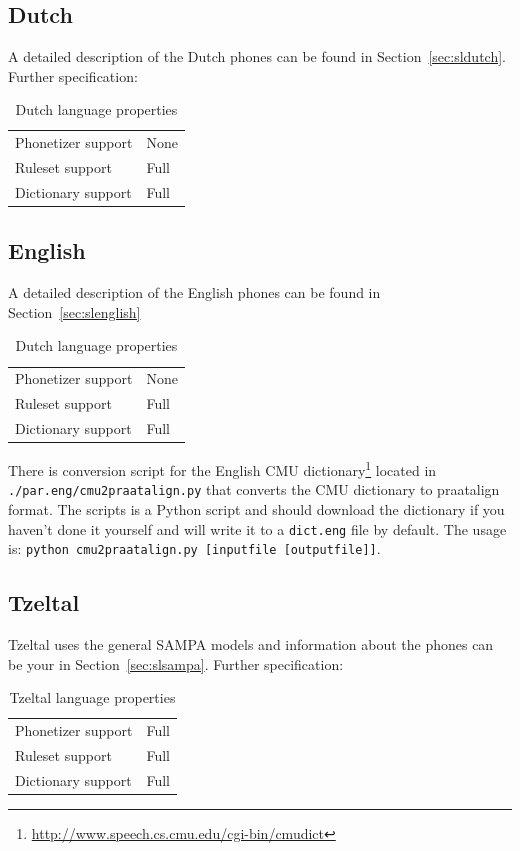 \documentclass[twoside,a4paper]{book}
\begin{document}
\subsection{Dutch}
A detailed description of the Dutch phones can be found in
Section~\ref{sec:sldutch}. Further specification:
\begin{table}[H]
	\caption{Dutch language properties}
	\begin{tabular}{ll}
		Phonetizer support & None\\
		Ruleset support & Full\\
		Dictionary support &  Full
	\end{tabular}
\end{table}

\subsection{English}
A detailed description of the English phones can be found in
Section~\ref{sec:slenglish}
\begin{table}[H]
	\caption{Dutch language properties}
	\begin{tabular}{ll}
		Phonetizer support & None\\
		Ruleset support & Full\\
		Dictionary support &  Full
	\end{tabular}
\end{table}
There is conversion script for the English CMU
dictionary\footnote{\url{http://www.speech.cs.cmu.edu/cgi-bin/cmudict}} located
in \texttt{./par.eng/cmu2praatalign.py} that converts the CMU dictionary to
praatalign format. The scripts is a Python script and should download the
dictionary if you haven't done it yourself and will write it to a
\texttt{dict.eng} file by default. The usage is: \texttt{python
cmu2praatalign.py [inputfile [outputfile]]}.

\subsection{Tzeltal}
Tzeltal uses the general SAMPA models and information about the phones can be
your in Section~\ref{sec:slsampa}. Further specification:
\begin{table}[H]
	\caption{Tzeltal language properties}
	\begin{tabular}{ll}
		Phonetizer support & Full\\
		Ruleset support & Full\\
		Dictionary support &  Full
	\end{tabular}
\end{table}
\end{document}
